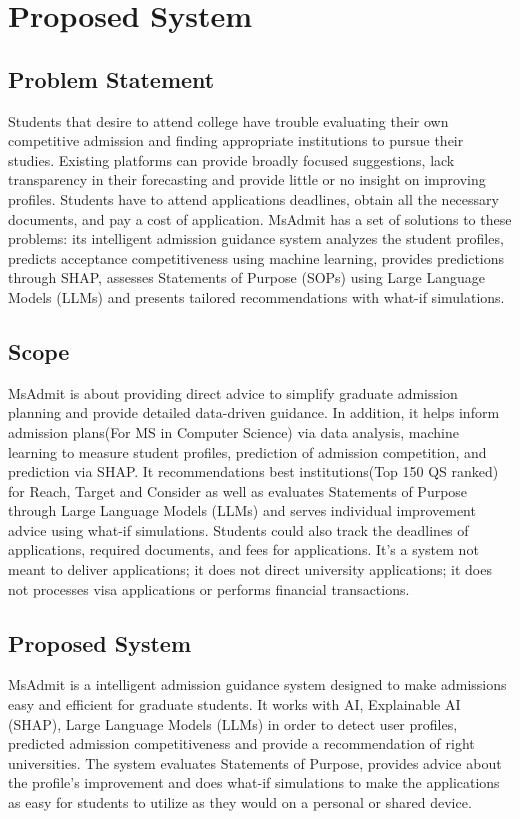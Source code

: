 
\chapter{Proposed System} \label{chap3}
\newpage

\section{Problem Statement}
\justify
Students that desire to attend college have trouble evaluating their own competitive admission and finding appropriate institutions to pursue their studies. Existing platforms can provide broadly focused suggestions, lack transparency in their forecasting and provide little or no insight on improving profiles. Students have to attend applications deadlines, obtain all the necessary documents, and pay a cost of application. MsAdmit has a set of solutions to these problems: its intelligent admission guidance system analyzes the student profiles, predicts acceptance competitiveness using machine learning, provides predictions through SHAP, assesses Statements of Purpose (SOPs) using Large Language Models (LLMs) and presents tailored recommendations with what-if simulations.

\section{Scope}
MsAdmit is about providing direct advice to simplify graduate admission planning and provide detailed data-driven guidance. In addition, it helps inform admission plans(For MS in Computer Science) via data analysis, machine learning to measure student profiles, prediction of admission competition, and prediction via SHAP. It recommendations best institutions(Top 150 QS ranked) for Reach, Target and Consider as well as evaluates Statements of Purpose through Large Language Models (LLMs) and serves individual improvement advice using what-if simulations. Students could also track the deadlines of applications, required documents, and fees for applications. It’s a system not meant to deliver applications; it does not direct university applications; it does not processes visa applications or performs financial transactions.

\section{Proposed System}
\justify
MsAdmit is a intelligent admission guidance system designed to make admissions easy and efficient for graduate students. It works with AI, Explainable AI (SHAP), Large Language Models (LLMs) in order to detect user profiles, predicted admission competitiveness and provide a recommendation of right universities. The system evaluates Statements of Purpose, provides advice about the profile's improvement and does what-if simulations to make the applications as easy for students to utilize as they would on a personal or shared device.




